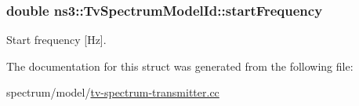 \subsubsection[{\texorpdfstring{start\+Frequency}{startFrequency}}]{\setlength{\rightskip}{0pt plus 5cm}double ns3\+::\+Tv\+Spectrum\+Model\+Id\+::start\+Frequency}\hypertarget{structns3_1_1TvSpectrumModelId_a87c5b77812d443722294fa9a95bd1bc6}{}\label{structns3_1_1TvSpectrumModelId_a87c5b77812d443722294fa9a95bd1bc6}


Start frequency \mbox{[}Hz\mbox{]}. 



The documentation for this struct was generated from the following file\+:\begin{DoxyCompactItemize}
\item 
spectrum/model/\hyperlink{tv-spectrum-transmitter_8cc}{tv-\/spectrum-\/transmitter.\+cc}\end{DoxyCompactItemize}
